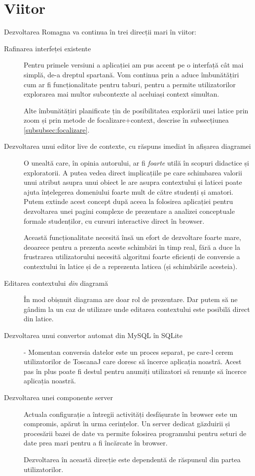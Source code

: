 \documentclass[12pt, a4paper, twoside, romanian]{teza-upb}
\begin{document}
  \section*{Viitor}
  \label{sec:future}
    Dezvoltarea Romagna va continua în trei direcții mari în viitor:
    \begin{description}
        \item [Rafinarea interfeței existente] Pentru primele versiuni a aplicației am pus accent pe o interfață cât mai simplă, de-a dreptul spartană. Vom continua prin a aduce îmbunătățiri cum ar fi funcționalitate pentru taburi, pentru a permite utilizatorilor explorarea mai multor subcontexte al aceluiași context simultan.

          Alte îmbunătățiri planificate țin de posibilitatea explorării unei latice prin zoom și prin metode de focalizare+context, descrise în subsecțiunea \ref{subsubsec:focalizare}.

        \item [Dezvoltarea unui editor live de contexte, cu răspuns imediat în afișarea diagramei] O unealtă care, în opinia autorului, ar fi \textit{foarte} utilă în scopuri didactice și exploratorii. A putea vedea direct implicațiile pe care schimbarea valorii unui atribut asupra unui obiect le are asupra contextului și laticei poate ajuta înțelegerea domeniului foarte mult de către studenți și amatori. Putem extinde acest concept după aceea la folosirea aplicației pentru dezvoltarea unei pagini complexe de prezentare a analizei conceptuale formale studenților, cu cursuri interactive direct în browser.

          Această funcționalitate necesită însă un efort de dezvoltare foarte mare, deoarece pentru a prezenta aceste schimbări în timp real, fără a duce la frustrarea utilizatorului necesită algoritmi foarte eficienți de conversie a contextului în latice și de a reprezenta laticea (și schimbările acesteia).


        \item [Editarea contextului \textit{din} diagramă] În mod obișnuit diagrama are doar rol de prezentare. Dar putem să ne gândim la un caz de utilizare unde editarea contextului este posibilă direct din latice.

        \item[Dezvoltarea unui convertor automat din MySQL în SQLite] - Momentan conversia datelor este un proces separat, pe care-l cerem utilizatorilor de ToscanaJ care doresc să încerce aplicația noastră. Acest pas în plus poate fi destul pentru anumiți utilizatori să renunțe să încerce aplicația noastră.

        \item [Dezvoltarea unei componente server] Actuala configurație a întregii activități desfășurate în browser este un compromis, apărut în urma cerințelor. Un server dedicat găzduirii și procesării bazei de date va permite folosirea programului pentru seturi de date prea mari pentru a fi încărcate în browser. 

          Dezvoltarea în această direcție este dependentă de răspunsul din partea utilizatorilor.
    \end{description}
\end{document}
